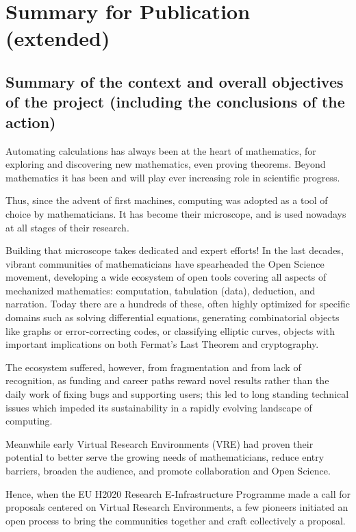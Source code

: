 \section{Summary for Publication (extended)}

\subsection{Summary of the context and overall objectives of the project (including the conclusions of the action)}

Automating calculations has always been at the heart of mathematics, for exploring and discovering new mathematics, even proving theorems. Beyond mathematics it has been and will play ever increasing role in scientific progress.

Thus, since the advent of first machines, computing was adopted as a tool of choice by mathematicians. It has become their microscope, and is used nowadays at all stages of their research.

Building that microscope takes dedicated and expert efforts! In the last decades, vibrant communities of mathematicians have spearheaded the Open Science movement, developing a wide ecosystem of open tools covering all aspects of mechanized mathematics: computation, tabulation (data), deduction, and narration. Today there are a hundreds of these, often highly optimized for specific domains such as solving differential equations, generating combinatorial objects like graphs or error-correcting codes, or classifying elliptic curves, objects with important implications on both Fermat's Last Theorem and cryptography.
 
The ecosystem suffered, however, from fragmentation and from lack of recognition, as funding and career paths reward novel results rather than the daily work of fixing bugs and supporting users; this led to long standing technical issues which impeded its sustainability in a rapidly evolving landscape of computing. 

Meanwhile early Virtual Research Environments (VRE) had proven their potential to better serve the growing needs of mathematicians, reduce entry barriers, broaden the audience, and promote collaboration and Open Science.

Hence, when the EU H2020 Research E-Infrastructure Programme made a call for  proposals centered on Virtual Research Environments, a few pioneers initiated an open process to bring the communities together and craft collectively a proposal.

